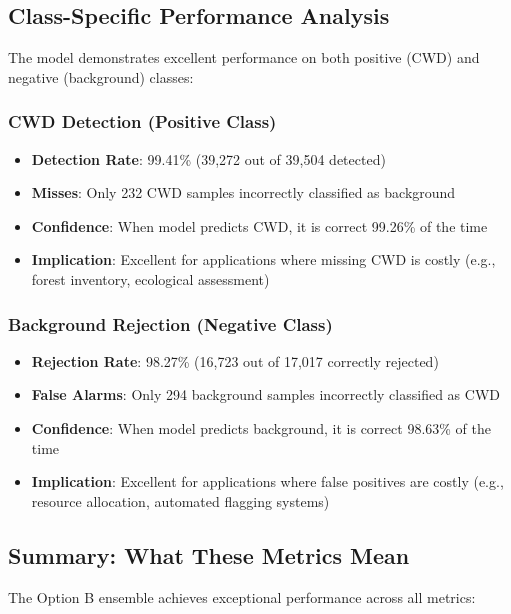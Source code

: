 \subsection{Class-Specific Performance Analysis}

The model demonstrates excellent performance on both positive (CWD) and negative (background) classes:

\subsubsection{CWD Detection (Positive Class)}

\begin{itemize}
    \item \textbf{Detection Rate}: 99.41\% (39,272 out of 39,504 detected)
    \item \textbf{Misses}: Only 232 CWD samples incorrectly classified as background
    \item \textbf{Confidence}: When model predicts CWD, it is correct 99.26\% of the time
    \item \textbf{Implication}: Excellent for applications where missing CWD is costly (e.g., forest
          inventory, ecological assessment)
\end{itemize}

\subsubsection{Background Rejection (Negative Class)}

\begin{itemize}
    \item \textbf{Rejection Rate}: 98.27\% (16,723 out of 17,017 correctly rejected)
    \item \textbf{False Alarms}: Only 294 background samples incorrectly classified as CWD
    \item \textbf{Confidence}: When model predicts background, it is correct 98.63\% of the time
    \item \textbf{Implication}: Excellent for applications where false positives are costly (e.g.,
          resource allocation, automated flagging systems)
\end{itemize}

\subsection{Summary: What These Metrics Mean}

The Option B ensemble achieves exceptional performance across all metrics:

